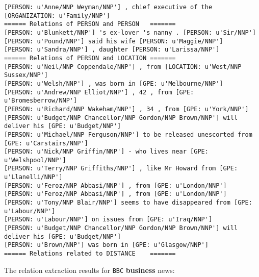 \documentclass[12pt]{report}
\begin{document}
\begin{scriptsize}
\begin{verbatim}
[PERSON: u'Anne/NNP Weyman/NNP'] , chief executive of the [ORGANIZATION: u'Family/NNP']
====== Relations of PERSON and PERSON	=======
[PERSON: u'Blunkett/NNP'] 's ex-lover 's nanny . [PERSON: u'Sir/NNP']
[PERSON: u'Pound/NNP'] said his wife [PERSON: u'Maggie/NNP']
[PERSON: u'Sandra/NNP'] , daughter [PERSON: u'Larissa/NNP']
====== Relations of PERSON and LOCATION	=======
[PERSON: u'Neil/NNP Coppendale/NNP'] , from [LOCATION: u'West/NNP Sussex/NNP']
[PERSON: u'Welsh/NNP'] , was born in [GPE: u'Melbourne/NNP']
[PERSON: u'Andrew/NNP Elliot/NNP'] , 42 , from [GPE: u'Bromesberrow/NNP']
[PERSON: u'Richard/NNP Wakeham/NNP'] , 34 , from [GPE: u'York/NNP']
[PERSON: u'Budget/NNP Chancellor/NNP Gordon/NNP Brown/NNP'] will deliver his [GPE: u'Budget/NNP']
[PERSON: u'Michael/NNP Ferguson/NNP'] to be released unescorted from [GPE: u'Carstairs/NNP']
[PERSON: u'Nick/NNP Griffin/NNP'] - who lives near [GPE: u'Welshpool/NNP']
[PERSON: u'Terry/NNP Griffiths/NNP'] , like Mr Howard from [GPE: u'Llanelli/NNP']
[PERSON: u'Feroz/NNP Abbasi/NNP'] , from [GPE: u'London/NNP']
[PERSON: u'Feroz/NNP Abbasi/NNP'] , from [GPE: u'London/NNP']
[PERSON: u'Tony/NNP Blair/NNP'] seems to have disappeared from [GPE: u'Labour/NNP']
[PERSON: u'Labour/NNP'] on issues from [GPE: u'Iraq/NNP']
[PERSON: u'Budget/NNP Chancellor/NNP Gordon/NNP Brown/NNP'] will deliver his [GPE: u'Budget/NNP']
[PERSON: u'Brown/NNP'] was born in [GPE: u'Glasgow/NNP']
====== Relations related to DISTANCE	=======
\end{verbatim}
\end{scriptsize}
\par The relation extraction results for \texttt{BBC} \textbf{business} news:
\end{document}
